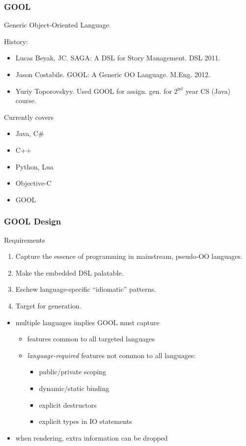\documentclass{beamer}
\begin{document}
\begin{frame}
\frametitle{GOOL}
{\Large {\color{blue}G}eneric {\color{blue}O}bject-{\color{blue}O}riented {\color{blue}L}anguage.}

History:
\begin{itemize}
\item Lucas Beyak, JC. SAGA: A DSL for Story Management. DSL 2011.
\item Jason Costabile. GOOL: A Generic OO Language. M.Eng. 2012.
\item Yuriy Toporovskyy. Used GOOL for assign. gen. for $2^{\text{nd}}$ year CS (Java) course.
\end{itemize}
\pause
Currently covers
\begin{itemize}
\item Java, C\#
\item C++
\item Python, Lua
\item Objective-C
\item GOOL
\end{itemize}
\end{frame}

\begin{frame}
\frametitle{GOOL Design}
{\Large Requirements}
\begin{enumerate}
\item Capture the essence of programming in mainstream, pseudo-OO languages.
\item Make the embedded DSL palatable.
\item Eschew language-specific ``idiomatic'' patterns.
\item Target for generation.
\end{enumerate}
\pause
\begin{itemize}
\item multiple languages implies GOOL must capture
\begin{itemize}
\item<3-> features common to all targeted languages
\item<4-> \emph{language-required} features not common to all languages:
\begin{itemize}
\item public/private scoping
\item dynamic/static binding
\item explicit destructors
\item explicit types in IO statements
\end{itemize}
\end{itemize}
\item<5-> when rendering, extra information can be dropped
\end{itemize}
\end{frame}
\end{document}
